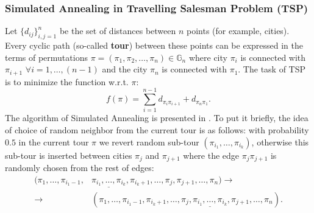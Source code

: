 \documentclass[12pt, bachelor, substylefile = algo_title.rtx]{disser}
\theoremstyle{definition}
\begin{document}
\subsubsection{Simulated Annealing in Travelling Salesman Problem (TSP)}
Let $\{d_{ij} \}_{i, j = 1}^{n}$ be the set of distances between $n$ points (for example, cities). Every cyclic path (so-called \textbf{tour}) between these points can be expressed in the terms of permutations $\pi = (\pi_1, \pi_2, \dots, \pi_n) \in \mathbb{G}_n$ where city $\pi_i$ is connected with $\pi_{i+1}$ $\forall i = 1,\dots, (n-1)$ and the city $\pi_n$ is connected with $\pi_1$. The task of TSP is to minimize the function w.r.t. $\pi$:
\[ f(\pi) = \sum_{i=1}^{n-1}d_{\pi_i \pi_{i+1}} + d_{\pi_n\pi_1}. \]
The algorithm of Simulated Annealing is presented in \cite{Yang11}. To put it briefly, the idea of choice of random neighbor from the current tour is as follows: with probability $0.5$ in the current tour $\pi$ we revert random sub-tour $(\pi_{i_1},\dots,\pi_{i_k})$, otherwise this sub-tour is inserted between cities $\pi_j$ and $\pi_{j+1}$ where the edge $\pi_j \pi_{j+1}$ is randomly chosen from the rest of edges:
\begin{align*}
(\pi_1,\dots, \pi_{i_1-1}, &\underline{\pi_{i_1},  \dots, \pi_{i_k}}, \pi_{i_{k}+1}, \dots, \pi_j, \pi_{j+1},\dots, \pi_n) \to \\ \to &  (\pi_1,\dots, \pi_{i_1-1}, \pi_{i_{k}+1}, \dots, \pi_j, \underline{\pi_{i_1}, \dots, \pi_{i_k}}, \pi_{j+1},\dots, \pi_n).
\end{align*}
\end{document}
